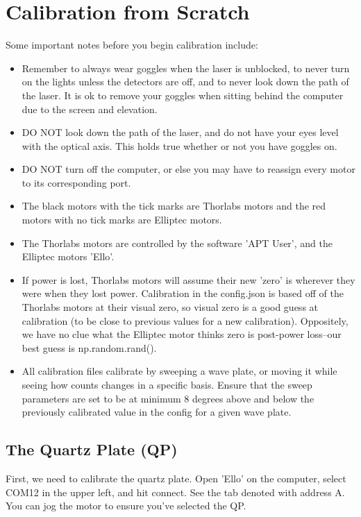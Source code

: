 \documentclass{paper}[11pt]
\begin{document}
\section{Calibration from Scratch}
Some important notes before you begin calibration include:
\begin{itemize}
    \item Remember to always wear goggles when the laser is unblocked, to never turn on the lights unless the detectors are off, and to never look down the path of the laser. It is ok to remove your goggles when sitting behind the computer due to the screen and elevation. 
    \item DO NOT look down the path of the laser, and do not have your eyes level with the optical axis. This holds true whether or not you have goggles on.
    \item DO NOT turn off the computer, or else you may have to reassign every motor to its corresponding port. 
    \item The black motors with the tick marks are Thorlabs motors and the red motors with no tick marks are Elliptec motors.
    \item The Thorlabs motors are controlled by the software 'APT User', and the Elliptec motors 'Ello'.
    \item If power is lost, Thorlabs motors will assume their new 'zero' is wherever they were when they lost power. Calibration in the config.json is based off of the Thorlabs motors at their visual zero, so visual zero is a good guess at calibration (to be close to previous values for a new calibration). Oppositely, we have no clue what the Elliptec motor thinks zero is post-power loss--our best guess is np.random.rand().
    \item All calibration files calibrate by sweeping a wave plate, or moving it while seeing how counts changes in a specific basis. Ensure that the sweep parameters are set to be at minimum 8 degrees above and below the previously calibrated value in the config for a given wave plate. 
\end{itemize}

\subsection{The Quartz Plate (QP)}
First, we need to calibrate the quartz plate. Open 'Ello' on the computer, select COM12 in the upper left, and hit connect. See the tab denoted with address A. You can jog the motor to ensure you've selected the QP. 
\end{document}

